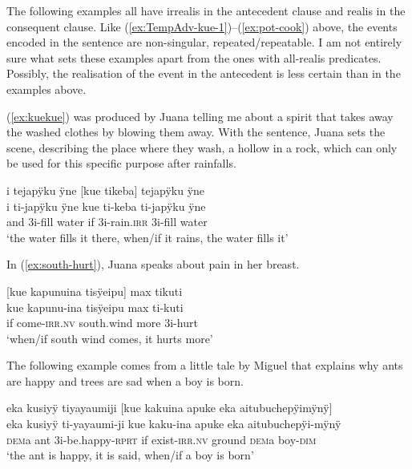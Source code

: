 The following examples all have irrealis in the antecedent clause and realis in the consequent clause. Like (\ref{ex:TempAdv-kue-1})–(\ref{ex:pot-cook}) above, the events encoded in the sentence are non-singular, repeated/repeatable. I am not entirely sure what sets these examples apart from the ones with all-realis predicates. Possibly, the realisation of the event in the antecedent is less certain than in the examples above.

(\ref{ex:kuekue}) was produced by Juana telling me about a spirit that takes away the washed clothes by blowing them away. With the sentence, Juana sets the scene, describing the place where they wash, a hollow in a rock, which can only be used for this specific purpose after rainfalls.

\ea\label{ex:kuekue}
\begingl
\glpreamble i tejapÿku ÿne \textup{[}kue tikeba\textup{]} tejapÿku ÿne\\
\gla i ti-japÿku ÿne kue ti-keba ti-japÿku ÿne\\
\glb and 3i-fill water if 3i-rain.\textsc{irr} 3i-fill water\\
\glft ‘the water fills it there, when/if it rains, the water fills it’
\endgl
\trailingcitation{[jxx-p151020l-2]}
\xe

In (\ref{ex:south-hurt}), Juana speaks about pain in her breast. 

\ea\label{ex:south-hurt}
\begingl
\glpreamble \textup{[}kue kapunuina tisÿeipu\textup{]} max tikuti\\
\gla kue kapunu-ina tisÿeipu max ti-kuti\\
\glb if come-\textsc{irr.nv} south.wind more 3i-hurt\\
\glft ‘when/if south wind comes, it hurts more’
\endgl
\trailingcitation{[jxx-p120430l-1.326]}
\xe

The following example comes from a little tale by Miguel that explains why ants are happy and trees are sad when a boy is born.

\ea\label{ex:happy-born}
\begingl
\glpreamble eka kusiyÿ tiyayaumiji \textup{[}kue kakuina apuke eka aitubuchepÿimÿnÿ\textup{]}\\
\gla eka kusiyÿ ti-yayaumi-ji kue kaku-ina apuke eka aitubuchepÿi-mÿnÿ\\
\glb \textsc{dem}a ant 3i-be.happy-\textsc{rprt} if exist-\textsc{irr.nv} ground \textsc{dem}a boy-\textsc{dim}\\
\glft ‘the ant is happy, it is said, when/if a boy is born’
\endgl
{}
\xe

